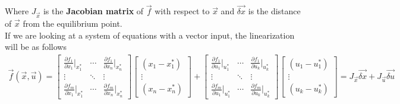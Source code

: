     Where $J_{\vec{x}}$ is the \textbf{Jacobian matrix} of $\vec{f}$ with respect to $\vec{x}$ and $\vec{\delta x}$ is the distance of $\vec{x}$ from the equilibrium point. \\
    \newline
    If we are looking at a system of equations with a vector input, the linearization will be as follows
    \begin{align*}
        \vec{f}(\vec{x}, \vec{u}) = \begin{bmatrix}
            \frac{\partial f_1}{\partial x_1} \bigg\rvert_{x_1^*} & \cdots & \frac{\partial f_1}{\partial x_n} \bigg\rvert_{x_n^*} \\
            \vdots & \ddots & \vdots \\
            \frac{\partial f_m}{\partial x_1} \bigg\rvert_{x_1^*} & \cdots & \frac{\partial f_m}{\partial x_n} \bigg\rvert_{x_n^*}
        \end{bmatrix} \begin{bmatrix}
            (x_1 - x_1^*) \\
            \vdots \\
            (x_n - x_n^*)
        \end{bmatrix} + \begin{bmatrix}
            \frac{\partial f_1}{\partial u_1} \bigg\rvert_{u_1^*} & \cdots & \frac{\partial f_1}{\partial u_k} \bigg\rvert_{u_k^*} \\
            \vdots & \ddots & \vdots \\
            \frac{\partial f_m}{\partial u_1} \bigg\rvert_{u_1^*} & \cdots & \frac{\partial f_m}{\partial u_k} \bigg\rvert_{u_k^*}
        \end{bmatrix} \begin{bmatrix}
            (u_1 - u_1^*) \\
            \vdots \\
            (u_k - u_k^*)
        \end{bmatrix} = \boxed{J_{\vec{x}} \vec{\delta x} + J_{\vec{u}} \vec{\delta u}}
    \end{align*}


\clearpage

\begin{qunlist}

\clearpage

\clearpage

\clearpage

\end{qunlist}

